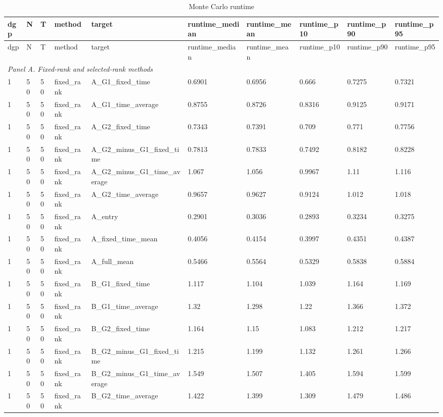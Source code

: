 \begingroup
\small
\begin{longtable}{llllllllll}
\caption{Monte Carlo runtime}\label{tab:mc-runtime}\\
\toprule
dgp & N & T & method & target & runtime\_median & runtime\_mean & runtime\_p10 & runtime\_p90 & runtime\_p95 \\
\midrule
\endfirsthead
\toprule
dgp & N & T & method & target & runtime\_median & runtime\_mean & runtime\_p10 & runtime\_p90 & runtime\_p95 \\
\midrule
\endhead
\multicolumn{10}{l}{\textit{Panel A. Fixed-rank and selected-rank methods}} \\
1 & 50 & 50 & fixed\_rank & A\_G1\_fixed\_time & 0.6901 & 0.6956 & 0.666 & 0.7275 & 0.7321 \\
1 & 50 & 50 & fixed\_rank & A\_G1\_time\_average & 0.8755 & 0.8726 & 0.8316 & 0.9125 & 0.9171 \\
1 & 50 & 50 & fixed\_rank & A\_G2\_fixed\_time & 0.7343 & 0.7391 & 0.709 & 0.771 & 0.7756 \\
1 & 50 & 50 & fixed\_rank & A\_G2\_minus\_G1\_fixed\_time & 0.7813 & 0.7833 & 0.7492 & 0.8182 & 0.8228 \\
1 & 50 & 50 & fixed\_rank & A\_G2\_minus\_G1\_time\_average & 1.067 & 1.056 & 0.9967 & 1.11 & 1.116 \\
1 & 50 & 50 & fixed\_rank & A\_G2\_time\_average & 0.9657 & 0.9627 & 0.9124 & 1.012 & 1.018 \\
1 & 50 & 50 & fixed\_rank & A\_entry & 0.2901 & 0.3036 & 0.2893 & 0.3234 & 0.3275 \\
1 & 50 & 50 & fixed\_rank & A\_fixed\_time\_mean & 0.4056 & 0.4154 & 0.3997 & 0.4351 & 0.4387 \\
1 & 50 & 50 & fixed\_rank & A\_full\_mean & 0.5466 & 0.5564 & 0.5329 & 0.5838 & 0.5884 \\
1 & 50 & 50 & fixed\_rank & B\_G1\_fixed\_time & 1.117 & 1.104 & 1.039 & 1.164 & 1.169 \\
1 & 50 & 50 & fixed\_rank & B\_G1\_time\_average & 1.32 & 1.298 & 1.22 & 1.366 & 1.372 \\
1 & 50 & 50 & fixed\_rank & B\_G2\_fixed\_time & 1.164 & 1.15 & 1.083 & 1.212 & 1.217 \\
1 & 50 & 50 & fixed\_rank & B\_G2\_minus\_G1\_fixed\_time & 1.215 & 1.199 & 1.132 & 1.261 & 1.266 \\
1 & 50 & 50 & fixed\_rank & B\_G2\_minus\_G1\_time\_average & 1.549 & 1.507 & 1.405 & 1.594 & 1.599 \\
1 & 50 & 50 & fixed\_rank & B\_G2\_time\_average & 1.422 & 1.399 & 1.309 & 1.479 & 1.486 \\

\end{longtable}
